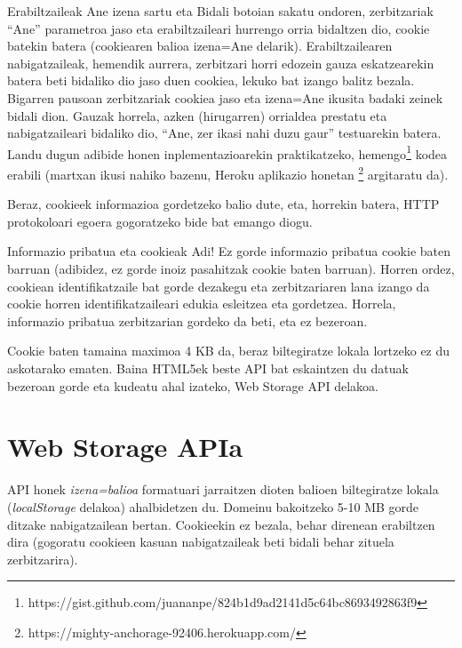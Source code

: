 Erabiltzaileak Ane izena sartu eta Bidali botoian sakatu ondoren, zerbitzariak ``Ane'' parametroa jaso eta erabiltzaileari hurrengo orria bidaltzen dio, cookie batekin batera (cookiearen balioa izena=Ane delarik). Erabiltzailearen nabigatzaileak, hemendik aurrera, zerbitzari horri edozein gauza eskatzearekin batera beti bidaliko dio jaso duen cookiea, lekuko bat izango balitz bezala. Bigarren pausoan zerbitzariak cookiea jaso eta izena=Ane ikusita badaki zeinek bidali dion. Gauzak horrela, azken (hirugarren) orrialdea prestatu eta nabigatzaileari bidaliko dio, 
``Ane, zer ikasi nahi duzu gaur'' testuarekin batera. Landu dugun adibide honen inplementazioarekin praktikatzeko, hemengo\footnote{https://gist.github.com/juananpe/824b1d9ad2141d5c64bc8693492863f9} kodea erabili (martxan ikusi nahiko bazenu, Heroku aplikazio honetan \footnote{https://mighty-anchorage-92406.herokuapp.com/} argitaratu da).

Beraz, cookieek informazioa gordetzeko balio dute, eta, horrekin batera, HTTP protokoloari egoera gogoratzeko bide bat emango diogu. %

\begin{alertinfo}{Informazio pribatua eta cookieak}
Adi! Ez gorde informazio pribatua cookie baten barruan (adibidez, ez gorde inoiz pasahitzak cookie baten barruan). Horren ordez, cookiean identifikatzaile bat gorde dezakegu eta zerbitzariaren lana izango da cookie horren identifikatzaileari edukia esleitzea eta gordetzea. Horrela, informazio pribatua zerbitzarian gordeko da beti, eta ez bezeroan. 
\end{alertinfo}

Cookie baten tamaina maximoa 4 KB da, beraz biltegiratze lokala lortzeko ez du askotarako ematen. Baina HTML5ek beste API bat eskaintzen du datuak bezeroan gorde eta kudeatu ahal izateko, Web Storage API  delakoa.

\section{Web Storage APIa}

API honek \textit{izena=balioa} formatuari jarraitzen dioten balioen biltegiratze lokala (\textit{localStorage}  delakoa) ahalbidetzen du. Domeinu bakoitzeko 5-10 MB gorde ditzake nabigatzailean bertan. Cookieekin ez bezala, behar direnean erabiltzen dira (gogoratu cookieen kasuan nabigatzaileak beti bidali behar zituela zerbitzarira).

